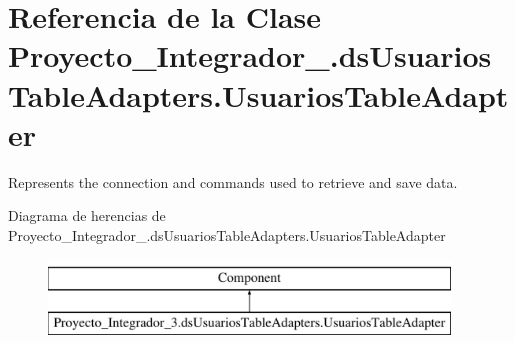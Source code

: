 \hypertarget{class_proyecto___integrador__3_1_1ds_usuarios_table_adapters_1_1_usuarios_table_adapter}{\section{Referencia de la Clase Proyecto\-\_\-\-Integrador\-\_.\-ds\-Usuarios\-Table\-Adapters.\-Usuarios\-Table\-Adapter}
\label{class_proyecto___integrador__3_1_1ds_usuarios_table_adapters_1_1_usuarios_table_adapter}
}


Represents the connection and commands used to retrieve and save data.  


Diagrama de herencias de Proyecto\-\_\-\-Integrador\-\_.\-ds\-Usuarios\-Table\-Adapters.\-Usuarios\-Table\-Adapter\begin{figure}[H]
\begin{center}
\leavevmode
\includegraphics[height=2.000000cm]{class_proyecto___integrador__3_1_1ds_usuarios_table_adapters_1_1_usuarios_table_adapter}
\end{center}
\end{figure}

